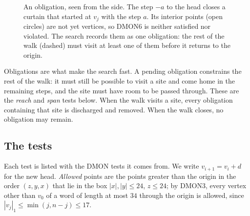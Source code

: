 \documentclass[11pt]{article}
\theoremstyle{plain}
\theoremstyle{definition}
\theoremstyle{remark}
\newcommand{\dmon}[1]{\textup{DMON#1}}
\begin{document}
\begin{figure}[t]
\centering
\FigObligation
\caption{An obligation, seen from the side. The step $-a$ to the head closes a curtain that started at
$v_j$ with the step $a$. Its interior points (open circles) are not yet vertices, so \dmon6 is neither
satisfied nor violated. The search records them as one obligation: the rest of the walk (dashed) must
visit at least one of them before it returns to the origin.}
\label{fig:obligation}
\end{figure}

Obligations are what make the search fast. A pending obligation constrains the rest of the walk: it
must still be possible to visit a site and come home in the remaining steps, and the site must have
room to be passed through. These are the \emph{reach} and \emph{span} tests below. When the walk
visits a site, every obligation containing that site is discharged and removed. When the walk closes,
no obligation may remain.

\subsection{The tests}\label{sec:tests}

Each test is listed with the DMON tests it comes from. We write $v_{i+1}=v_i+d$ for the new head.
\emph{Allowed} points are the points greater than the origin in the order $(z,y,x)$ that lie in the box
$|x|,|y|\le24$, $z\le24$; by \dmon3, every vertex other than $v_0$ of a word of length at most $34$
through the origin is allowed, since $|v_j|_1\le\min(j,n-j)\le17$.
\end{document}

